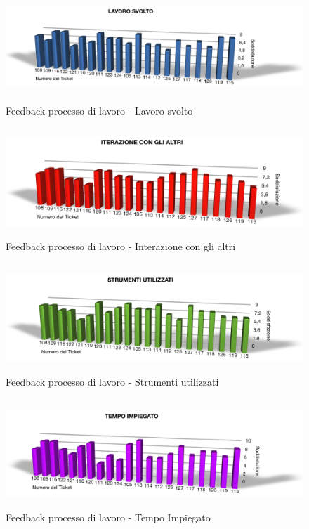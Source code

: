 \begin{figure}[htbp]
  \centering
  \includegraphics[height=4.1cm]{img/PQ/LavoroSvolto.png}
\caption{Feedback processo di lavoro - Lavoro svolto}
\end{figure}

\begin{figure}[htbp]
  \centering
  \includegraphics[height=4.1cm]{img/PQ/IterazioneConGliAltri.png}
\caption{Feedback processo di lavoro - Interazione con gli altri}
\end{figure}

\begin{figure}[htbp]
  \centering
  \includegraphics[height=4.1cm]{img/PQ/Strumenti.png}
\caption{Feedback processo di lavoro - Strumenti utilizzati}
\end{figure}

\begin{figure}[htbp]
  \centering
  \includegraphics[height=4.1cm]{img/PQ/TempoImpiegato.png}
\caption{Feedback processo di lavoro - Tempo Impiegato}
\end{figure}


